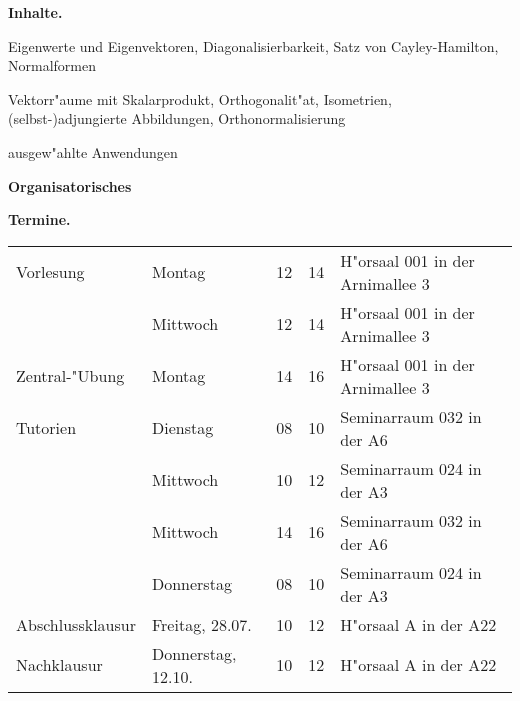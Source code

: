 \documentclass[a4,11pt]{article}
\begin{document}
{\bfseries Inhalte.}
\begin{compactitem}
\item Eigenwerte und Eigenvektoren, Diagonalisierbarkeit,
  Satz von Cayley-Hamilton, Normalformen
\item Vektorr"aume mit Skalarprodukt, Orthogonalit"at, Isometrien,
  (selbst-)adjungierte Abbildungen, Orthonormalisierung
\item ausgew"ahlte Anwendungen
\end{compactitem}

\mbox{}
\vfill

\begin{center}
  \LARGE \bfseries Organisatorisches
\end{center}

%
\bigskip

{\bfseries Termine.} %
%
\newline
\begin{tabular}[t]{llr@{--}ll}
  Vorlesung 
  & Montag      & 12&14 & H"orsaal %
  001 in der Arnimallee 3  \\
  & Mittwoch & 12&14 & H"orsaal 001 in der Arnimallee 3 \\
  Zentral-"Ubung  
  & Montag      &  14&16 & H"orsaal 001 in der Arnimallee 3 \\
  Tutorien
  & Dienstag & 08&10 & Seminarraum 032 in der A6 \\ %
  & Mittwoch & 10&12 & Seminarraum 024 in der A3 \\ %
  & Mittwoch & 14&16 & Seminarraum 032 in der A6 \\ %
  & Donnerstag & 08&10 & Seminarraum 024 in der A3 \\ %
  Abschlussklausur
  & Freitag, 28.07.  & 10&12 & H"orsaal A in der A22 \\
  Nachklausur
  & Donnerstag, 12.10. & 10&12 & H"orsaal A in der A22 \\
\end{tabular}
\bigskip
\end{document}
